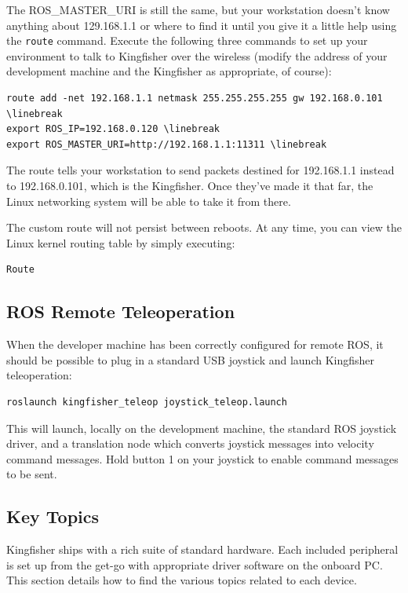 \documentclass[]{clearpath-latex/clearpath-manual}
\begin{document}
\begin{enumerate}[nolistsep]
\begin{enumerate}[nolistsep]
The ROS_MASTER_URI is still the same, but your workstation doesn’t know anything about 129.168.1.1 or where to find it until you give it a little help using the \lstinline{route} command. Execute the following three commands to set up your environment to talk to Kingfisher over the wireless (modify the address of your development machine and the Kingfisher as appropriate, of course):

\begin{lstlisting}
route add -net 192.168.1.1 netmask 255.255.255.255 gw 192.168.0.101 \linebreak
export ROS_IP=192.168.0.120 \linebreak
export ROS_MASTER_URI=http://192.168.1.1:11311 \linebreak
\end{lstlisting}

The route tells your workstation to send packets destined for 192.168.1.1 instead to 192.168.0.101, which is the Kingfisher. Once they’ve made it that far, the Linux networking system will be able to take it from there.

The custom route will not persist between reboots. At any time, you can view the Linux kernel routing table by simply executing:

\begin{lstlisting}
Route
\end{lstlisting}

\subsection{ROS Remote Teleoperation}

When the developer machine has been correctly configured for remote ROS, it should be possible to plug in a standard USB joystick and launch Kingfisher teleoperation:

\begin{lstlisting}
roslaunch kingfisher_teleop joystick_teleop.launch
\end{lstlisting}

This will launch, locally on the development machine, the standard ROS joystick driver, and a translation node which converts joystick messages into velocity command messages. Hold button 1 on your joystick to enable command messages to be sent.

\pagebreak

\subsection{Key Topics}
Kingfisher ships with a rich suite of standard hardware. Each included peripheral is set up from the get-go with appropriate driver software on the onboard PC. This section details how to find the various topics related to each device.


\end{enumerate}
\end{enumerate}
\end{document}
